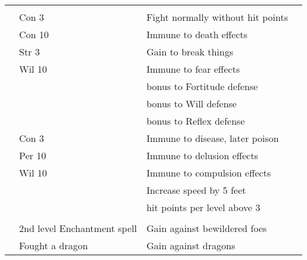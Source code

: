 {\small
    \begin{longtabu}{>{\lcol}p{10em} >{\lcol}p{15em} >{\lcol}X >{\lcol}p{3em}}
         &  &  &  \\
         & Con 3 & Fight normally without hit points &  \\
         & Con 10 & Immune to death effects &  \\
         & Str 3 & Gain  to break things &  \\
         & Wil 10 & Immune to fear effects &  \\
         & \x &  bonus to Fortitude defense &  \\
         & \x &  bonus to Will defense &  \\
         & \x &   bonus to Reflex defense &  \\
         & Con 3 & Immune to disease, later poison &  \\
         & Per 10 & Immune to delusion effects &  \\
         & Wil 10 & Immune to compulsion effects &  \\
         & \x & Increase speed by 5 feet &  \\
         & \x &   hit points  per level above 3 &  \\

        \midrule
         &  &  &  \\
         & 2nd level Enchantment spell & Gain  against bewildered foes &  \\
         & Fought a dragon & Gain  against dragons &  \\


\end{longtabu}}
